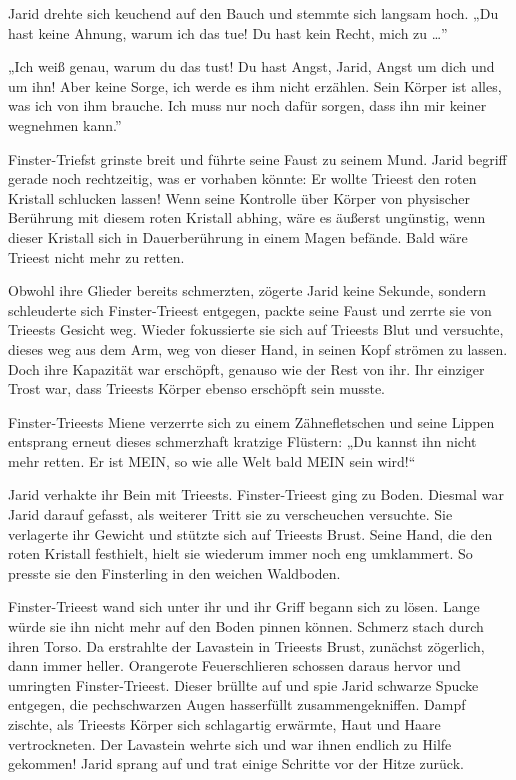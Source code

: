 Jarid drehte sich keuchend auf den Bauch und stemmte sich langsam hoch. „Du hast keine Ahnung, warum ich das tue! Du hast kein Recht, mich zu …”

„Ich weiß genau, warum du das tust! Du hast Angst, Jarid, Angst um dich und um ihn! Aber keine Sorge, ich werde es ihm nicht erzählen. Sein Körper ist alles, was ich von ihm brauche. Ich muss nur noch dafür sorgen, dass ihn mir keiner wegnehmen kann.”

Finster-Triefst grinste breit und führte seine Faust zu seinem Mund. Jarid begriff gerade noch rechtzeitig, was er vorhaben könnte: Er wollte Trieest den roten Kristall schlucken lassen! Wenn seine Kontrolle über Körper von physischer Berührung mit diesem roten Kristall abhing, wäre es äußerst ungünstig, wenn dieser Kristall sich in Dauerberührung in einem Magen befände. Bald wäre Trieest nicht mehr zu retten.

Obwohl ihre Glieder bereits schmerzten, zögerte Jarid keine Sekunde, sondern schleuderte sich Finster-Trieest entgegen, packte seine Faust und zerrte sie von Trieests Gesicht weg. Wieder fokussierte sie sich auf Trieests Blut und versuchte, dieses weg aus dem Arm, weg von dieser Hand, in seinen Kopf strömen zu lassen. Doch ihre Kapazität war erschöpft, genauso wie der Rest von ihr. Ihr einziger Trost war, dass Trieests Körper ebenso erschöpft sein musste.

Finster-Trieests Miene verzerrte sich zu einem Zähnefletschen und seine Lippen entsprang erneut dieses schmerzhaft kratzige Flüstern: „Du kannst ihn nicht mehr retten. Er ist MEIN, so wie alle Welt bald MEIN sein wird!“

Jarid verhakte ihr Bein mit Trieests. Finster-Trieest ging zu Boden. Diesmal war Jarid darauf gefasst, als weiterer Tritt sie zu verscheuchen versuchte. Sie verlagerte ihr Gewicht und stützte sich auf Trieests Brust. Seine Hand, die den roten Kristall festhielt, hielt sie wiederum immer noch eng umklammert. So presste sie den Finsterling in den weichen Waldboden.

Finster-Trieest wand sich unter ihr und ihr Griff begann sich zu lösen. Lange würde sie ihn nicht mehr auf den Boden pinnen können. Schmerz stach durch ihren Torso. Da erstrahlte der Lavastein in Trieests Brust, zunächst zögerlich, dann immer heller. Orangerote Feuerschlieren schossen daraus hervor und umringten Finster-Trieest. Dieser brüllte auf und spie Jarid schwarze Spucke entgegen, die pechschwarzen Augen hasserfüllt zusammengekniffen. Dampf zischte, als Trieests Körper sich schlagartig erwärmte, Haut und Haare vertrockneten. Der Lavastein wehrte sich und war ihnen endlich zu Hilfe gekommen! Jarid sprang auf und trat einige Schritte vor der Hitze zurück.

